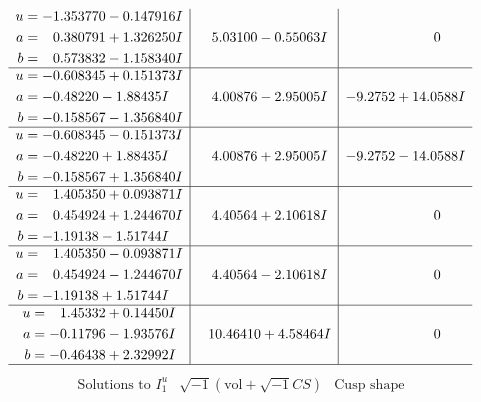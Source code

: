 \documentclass[1p]{elsarticle_modified}
\theoremstyle{definition}
\newcommand{\I}{\sqrt{-1}}
\begin{document}
$$\begin{array}{c|c|c}
\begin{aligned}
u &= -1.353770 - 0.147916 I \\
a &= \phantom{-}0.380791 + 1.326250 I \\
b &= \phantom{-}0.573832 - 1.158340 I\end{aligned}
 & \phantom{-}5.03100 - 0.55063 I & \phantom{-0.000000 } 0 \\ \hline\begin{aligned}
u &= -0.608345 + 0.151373 I \\
a &= -0.48220 - 1.88435 I \\
b &= -0.158567 - 1.356840 I\end{aligned}
 & \phantom{-}4.00876 - 2.95005 I & -9.2752 + 14.0588 I \\ \hline\begin{aligned}
u &= -0.608345 - 0.151373 I \\
a &= -0.48220 + 1.88435 I \\
b &= -0.158567 + 1.356840 I\end{aligned}
 & \phantom{-}4.00876 + 2.95005 I & -9.2752 - 14.0588 I \\ \hline\begin{aligned}
u &= \phantom{-}1.405350 + 0.093871 I \\
a &= \phantom{-}0.454924 + 1.244670 I \\
b &= -1.19138 - 1.51744 I\end{aligned}
 & \phantom{-}4.40564 + 2.10618 I & \phantom{-0.000000 } 0 \\ \hline\begin{aligned}
u &= \phantom{-}1.405350 - 0.093871 I \\
a &= \phantom{-}0.454924 - 1.244670 I \\
b &= -1.19138 + 1.51744 I\end{aligned}
 & \phantom{-}4.40564 - 2.10618 I & \phantom{-0.000000 } 0 \\ \hline\begin{aligned}
u &= \phantom{-}1.45332 + 0.14450 I \\
a &= -0.11796 - 1.93576 I \\
b &= -0.46438 + 2.32992 I\end{aligned}
 & \phantom{-}10.46410 + 4.58464 I & \phantom{-0.000000 } 0\\
 \hline 
 \end{array}$$\newpage$$\begin{array}{c|c|c}  
\text{Solutions to }I^u_{1}& \I (\text{vol} + \sqrt{-1}CS) & \text{Cusp shape}\\
 \hline 
\begin{aligned}

\end{aligned}
\end{array}$$
\end{document}
